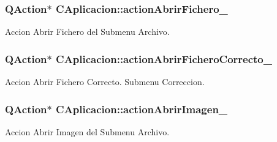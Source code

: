 \subsubsection[{\texorpdfstring{action\+Abrir\+Fichero\+\_\+}{actionAbrirFichero_}}]{\setlength{\rightskip}{0pt plus 5cm}Q\+Action$\ast$ C\+Aplicacion\+::action\+Abrir\+Fichero\+\_\+\hspace{0.3cm}{\ttfamily [private]}}\hypertarget{classCAplicacion_a4fa499b5119ad7bcc86f53ace963cbbd}{}\label{classCAplicacion_a4fa499b5119ad7bcc86f53ace963cbbd}


Accion Abrir Fichero del Submenu Archivo. 

\subsubsection[{\texorpdfstring{action\+Abrir\+Fichero\+Correcto\+\_\+}{actionAbrirFicheroCorrecto_}}]{\setlength{\rightskip}{0pt plus 5cm}Q\+Action$\ast$ C\+Aplicacion\+::action\+Abrir\+Fichero\+Correcto\+\_\+\hspace{0.3cm}{\ttfamily [private]}}\hypertarget{classCAplicacion_abd9f33aa366727875ab9c798e1a4695c}{}\label{classCAplicacion_abd9f33aa366727875ab9c798e1a4695c}


Accion Abrir Fichero Correcto. Submenu Correccion. 

\subsubsection[{\texorpdfstring{action\+Abrir\+Imagen\+\_\+}{actionAbrirImagen_}}]{\setlength{\rightskip}{0pt plus 5cm}Q\+Action$\ast$ C\+Aplicacion\+::action\+Abrir\+Imagen\+\_\+\hspace{0.3cm}{\ttfamily [private]}}\hypertarget{classCAplicacion_ac7f0a3871355c19d02bf87f36322cee7}{}\label{classCAplicacion_ac7f0a3871355c19d02bf87f36322cee7}


Accion Abrir Imagen del Submenu Archivo. 

